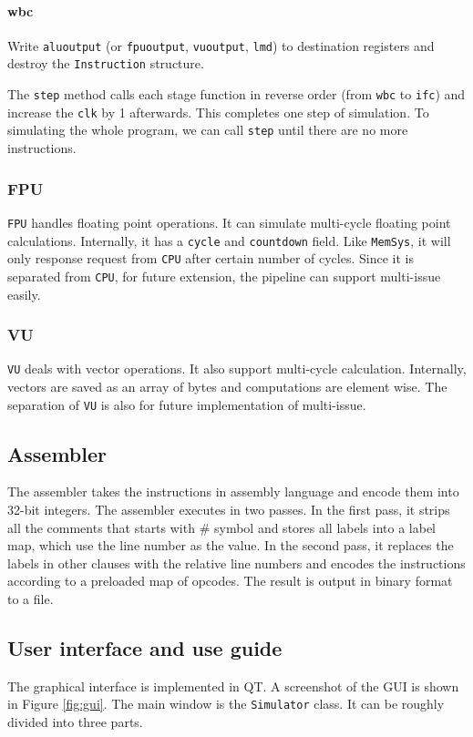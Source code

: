 \documentclass{sig-alternate}
\begin{document}
\paragraph{wbc}
Write \texttt{aluoutput} (or \texttt{fpuoutput}, \texttt{vuoutput}, \texttt{lmd}) to destination registers and destroy the \texttt{Instruction} structure.

The \texttt{step} method calls each stage function in reverse order (from \texttt{wbc} to \texttt{ifc}) and increase the \texttt{clk} by 1 afterwards. This completes one step of simulation. To simulating the whole program, we can call \texttt{step} until there are no more instructions. 

\subsubsection{FPU}
\texttt{FPU} handles floating point operations. It can simulate multi-cycle floating point calculations. Internally, it has a \texttt{cycle} and \texttt{countdown} field. Like \texttt{MemSys}, it will only response request from \texttt{CPU} after certain number of cycles. Since it is separated from \texttt{CPU}, for future extension, the pipeline can support multi-issue easily. 

\subsubsection{VU}
\texttt{VU} deals with vector operations. It also support multi-cycle calculation. Internally, vectors are saved as an array of bytes and computations are element wise. The separation of \texttt{VU} is also for future implementation of multi-issue.

\subsection{Assembler }
The assembler takes the instructions in assembly language and encode them into 32-bit integers. The assembler executes in two passes. In the first pass, it strips all the comments that starts with $\#$ symbol and stores all labels into a label map, which use the line number as the value. In the second pass, it replaces the labels in other clauses with the relative line numbers and encodes the instructions according to a preloaded map of opcodes. The result is output in binary format to a file. 

\subsection{User interface and use guide}
The graphical interface is implemented in QT. A screenshot of the GUI is shown in Figure \ref{fig:gui}. The main window is the \texttt{Simulator} class. It can be roughly divided into three parts. 
\end{document}
